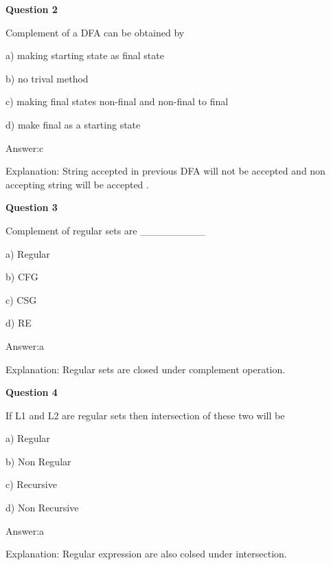 \documentclass{article}
\begin{document}
\begin{mdframed}[linewidth=1pt, roundcorner=5pt, linecolor=gray!30, backgroundcolor=gray!5]
\textbf{Question 2} 

Complement of a DFA can be obtained by

a) making starting state as final state

b) no trival method

c) making final states non-final and non-final to final

d) make final as a starting state
\vspace{5pt} \par
\begin{tcolorbox}[colback=green!5, colframe=green!40!black, title=Solution]
Answer:c

Explanation: String accepted in previous DFA will not be accepted and non accepting string will be accepted .
\end{tcolorbox}
\end{mdframed}

\begin{mdframed}[linewidth=1pt, roundcorner=5pt, linecolor=gray!30, backgroundcolor=gray!5]
\textbf{Question 3} 

Complement of regular sets are \_\_\_\_\_\_\_\_\_

a) Regular

b) CFG

c) CSG

d) RE
\vspace{5pt} \par
\begin{tcolorbox}[colback=green!5, colframe=green!40!black, title=Solution]
Answer:a

Explanation: Regular sets are closed under complement operation.
\end{tcolorbox}
\end{mdframed}
\newpage

\begin{mdframed}[linewidth=1pt, roundcorner=5pt, linecolor=gray!30, backgroundcolor=gray!5]
\textbf{Question 4} 

If L1 and L2 are regular sets then intersection of these two will be

a) Regular

b) Non Regular

c) Recursive

d) Non Recursive
\vspace{5pt} \par
\begin{tcolorbox}[colback=green!5, colframe=green!40!black, title=Solution]
Answer:a

Explanation: Regular expression are also colsed under intersection.
\end{tcolorbox}
\end{mdframed}
\end{document}
